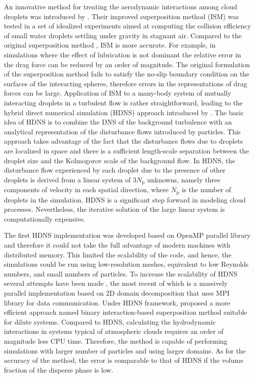 \documentclass[../thesis.tex]{subfiles}
\begin{document}
An innovative method for treating the aerodynamic interactions among cloud droplets was introduced by \cite{WAG05}. Their improved superposition method (ISM) was tested in a set of idealized experiments aimed at computing the collision efficiency of small water droplets settling under gravity in stagnant air. Compared to the original superposition method \citep{PK97}, ISM is more accurate. For example, in simulations where the effect of lubrication is not dominant the relative error in the drag force can be reduced by an order of magnitude. The original formulation of the superposition method fails to satisfy the no-slip boundary condition on the surfaces of the interacting spheres, therefore errors in the representations of drag forces can be large. Application of ISM to a many-body system of mutually interacting droplets in a turbulent flow is rather straightforward, leading to the hybrid direct numerical simulation (HDNS) approach introduced by \cite{AGW07}. The basic idea of HDNS is to combine the DNS of the background turbulence with an analytical representation of the disturbance flows introduced by particles. This approach takes advantage of the fact that the disturbance flows due to droplets are localized in space and there is a sufficient length-scale separation between the droplet size and the Kolmogorov scale of the background flow. In HDNS, the disturbance flow experienced by each droplet due to the presence of other droplets is derived from a linear system of $3N_\text{p}$ unknowns, namely three components of velocity in each spatial direction, where $N_\text{p}$ is the number of droplets in the simulation. HDNS is a significant step forward in modeling cloud processes. Nevertheless, the iterative solution of the large linear system is computationally expensive.

The first HDNS implementation was developed based on OpenMP parallel library \citep{AGW07} and therefore it could not take the full advantage of modern machines with distributed memory. This limited the scalability of the code, and hence, the simulations could be run using low-resolution meshes, equivalent to low Reynolds numbers, and small numbers of particles. To increase the scalability of HDNS several attempts have been made \citep{RW09, RPAWG11c, RPAWG11p, APCRW14}, the most recent of which \citep{TPARW13} is a massively parallel implementation based on 2D domain decomposition that uses MPI library for data communication. Under HDNS framework, \cite{OTV13} proposed a more efficient approach named binary interaction-based superposition method suitable for dilute systems. Compared to HDNS, calculating the hydrodynamic interactions in systems typical of atmospheric clouds requires an order of magnitude less CPU time. Therefore, the method is capable of performing simulations with larger number of particles and using larger domains. As for the accuracy of the method, the error is comparable to that of HDNS if the volume fraction of the disperse phase is low. 
\end{document}
